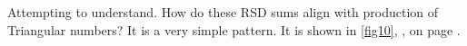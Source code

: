 \documentclass[12pt]{article}
\begin{document}
        Attempting to understand. How do these RSD sums align with production of Triangular 
        numbers? It is a very simple pattern. It is shown in \cref{fig10}, , on 
        page \pageref{fig10}.

    
%


%        
%            
%            
        

\end{document}
